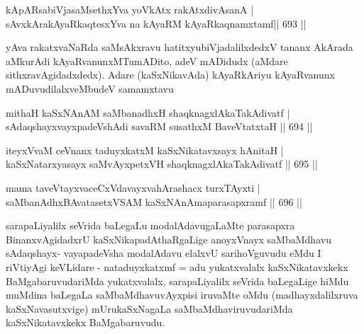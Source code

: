 
\begin{shl}
kApARsabiVjasaMsethxYva yoVkAtx rakAtxdivAsanA | \\
sAvxkArakAyaRkaqtesxYva na kAyaRM kAyaRkaqnamxtamf\hfill||  693 ||  
\end{shl}

\begin{artha}
yAva rakatxvaNaRda saMsAkxravu hatitxyubiVjadalilxdedxV tananx AkArada aMkurAdi kAyaRvanunxMTumADito, adeV mADidudx (aMdare sithxravAgidadxdedx). Adare (kaSxNikavAda) kAyaRkAriyu kAyaRvanunx mADuvudilalxveMbudeV samamxtavu
\end{artha}


\begin{shl}
mithaH kaSxNAnAM saMbanadhxH \footnotemark[1]shaqknagxlAkaTakAdivatf | \\
sAdaqshayxvayxpadeVshAdi savaRM susathxM BaveVtatxtaH \hfill||  694 ||  
\end{shl}
				
\begin{shl}
iteyxVvaM ceVnanx taduyxkatxM kaSxNikatavxsayx hAnitaH | \\
kaSxNatarxyasayx saMvAyxpetxVH shaqknagxlAkaTakAdivatf \hfill||  695 ||  
\end{shl}
				
\begin{shl}
mama taveVtayxvaceCxVdavayxvahArashacx turxTAyxti | \\
saMbanAdhxBAvatasetxVSAM kaSxNAnAmaparasapxramf \hfill||  696 ||  
\end{shl}

\begin{artha}
sarapaLiyalilx seVrida baLegaLu modalAdavugaLaMte parasapxra BinanxvAgidadxrU kaSxNikapadAthaRgaLige anoyxVnayx saMbaMdhavu sAdaqshayx- vayapadeVsha modalAdavu elalxvU sarihoVguvudu eMdu I riVtiyAgi keVLidare - nataduyxkatxmf = adu yukatxvalalx kaSxNikatavxkekx BaMgabaruvudariMda yukatxvalalx, sarapaLiyalilx seVrida baLegaLige hiMdu muMdina baLegaLa saMbaMdhavuvAyxpisi iruvaMte oMdu (madhayxdalilxruva kaSxNavasutxvige) mUrukaSxNagaLa saMbaMdhaviruvudariMda kaSxNikatavxkekx BaMgabaruvudu.
\end{artha}

